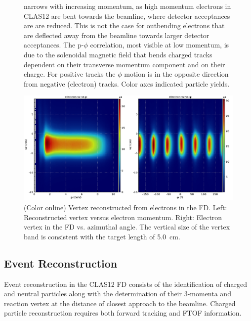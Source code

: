 \documentclass[final,3p,twocolumn]{elsarticle}
\begin{document}
\begin{figure}[h!]
{ narrows with increasing momentum, as high momentum electrons in CLAS12 are bent towards the beamline, where detector acceptances are are reduced. This is not the case for outbending electrons that are deflected away from the beamline 
 towards larger detector acceptances. The p-$\phi$ correlation, most visible at low momentum, is due to
  the solenoidal magnetic field that bends charged tracks dependent on their transverse momentum component
  and on their charge. For positive tracks the $\phi$ motion is in the opposite direction from negative (electron) tracks. 
  Color axes indicated particle yields.} 
\label{neg-pos}
\end{figure}
\begin{figure}[t!]
\centerline{\includegraphics[width=1.8\columnwidth]{e_vz.png}}
\caption{(Color online) Vertex reconstructed from electrons in the FD. Left: Reconstructed vertex versus electron momentum. 
Right: Electron vertex in the FD vs. azimuthal angle. The vertical size of the vertex band is consistent with the target length of 5.0~cm. } 
\label{vertex}
\end{figure}


\subsection{Event Reconstruction} 

Event reconstruction in the CLAS12 FD consists of the identification of charged and neutral particles along with the 
determination of their 3-momenta and reaction vertex at the distance of closest approach to the beamline.
Charged particle reconstruction requires both forward tracking and FTOF information. 
\end{document}
